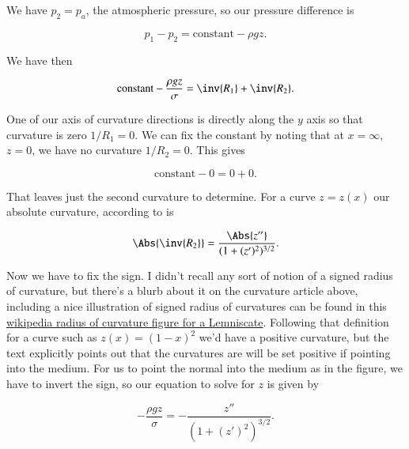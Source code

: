 {We have $p_2 = p_a$, the atmospheric pressure, so our pressure difference is

\begin{equation}\label{eqn:continuumFluidsReview:1570}
p_1 - p_2 = \text{constant} - \rho g z.
\end{equation}

We have then

\begin{equation}\label{eqn:continuumFluidsReview:1590}
\text{constant} -\frac{\rho g z}{\sigma} = \inv{R_1} + \inv{R_2}.
\end{equation}

One of our axis of curvature directions is directly along the $y$ axis so that curvature is zero $1/R_1 = 0$.  We can fix the constant by noting that at $x = \infty$, $z = 0$, we have no curvature $1/R_2 = 0$.  This gives

\begin{equation}\label{eqn:continuumFluidsReview:1690}
\text{constant} -0 = 0 + 0.
\end{equation}

That leaves just the second curvature to determine.  For a curve $z = z(x)$ our absolute curvature, according to \citep{wiki:curvature} is

\begin{equation}\label{eqn:continuumFluidsReview:1610}
\Abs{\inv{R_2}} = \frac{\Abs{z''}}{(1 + (z')^2)^{3/2}}.
\end{equation}

Now we have to fix the sign.  I didn't recall any sort of notion of a signed radius of curvature, but there's a blurb about it on the curvature article above, including a nice illustration of signed radius of curvatures can be found in this \href{http://goo.gl/Wqzz2}{wikipedia radius of curvature figure for a Lemniscate}.  Following that definition for a curve such as $z(x) = (1-x)^2$ we'd have a positive curvature, but the text explicitly points out that the curvatures are will be set positive if pointing into the medium.  For us to point the normal into the medium as in the figure, we have to invert the sign, so our equation to solve for $z$ is given by

\begin{equation}\label{eqn:continuumFluidsReview:1710}
-\frac{\rho g z}{\sigma} = -\frac{z''}{(1 + (z')^2)^{3/2}}.
\end{equation}

}
